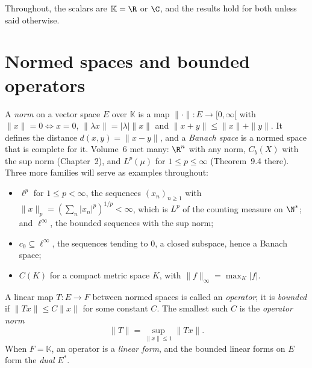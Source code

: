 Throughout, the scalars are $\mathbb K=\R$ or $\C$, and the results hold for both unless said otherwise.

\section{Normed spaces and bounded operators}

A \emph{norm} on a vector space $E$ over $\mathbb K$ is a map $\|\cdot\|:E\to[0,\infty[$ with $\|x\|=0\iff x=0$, $\|\lambda x\|=|\lambda|\|x\|$ and $\|x+y\|\le\|x\|+\|y\|$. It defines the distance
$d(x,y)=\|x-y\|$, and a \emph{Banach space} is a normed space that is complete for it. Volume~6 met many: $\R^n$ with any norm, $C_b(X)$ with the sup norm (Chapter~2), and $L^p(\mu)$ for $1\le p\le\infty$
(Theorem~9.4 there). Three more families will serve as examples throughout:
\begin{itemize}
\item $\ell^p$ for $1\le p<\infty$, the sequences $(x_n)_{n\ge1}$ with $\|x\|_p=(\sum_n|x_n|^p)^{1/p}<\infty$, which is $L^p$ of the counting measure on $\N^*$; and $\ell^\infty$, the bounded sequences with the sup norm;
\item $c_0\subseteq\ell^\infty$, the sequences tending to $0$, a closed subspace, hence a Banach space;
\item $C(K)$ for a compact metric space $K$, with $\|f\|_\infty=\max_K|f|$.
\end{itemize}

A linear map $T:E\to F$ between normed spaces is called an \emph{operator}; it is \emph{bounded} if $\|Tx\|\le C\|x\|$ for some constant $C$. The smallest such $C$ is the \emph{operator norm}
\[\|T\|=\sup_{\|x\|\le1}\|Tx\|.\]
When $F=\mathbb K$, an operator is a \emph{linear form}, and the bounded linear forms on $E$ form the \emph{dual} $E^*$.

